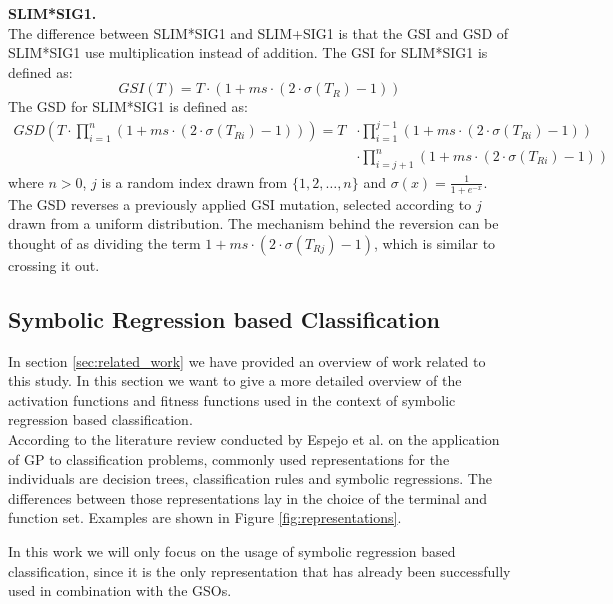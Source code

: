 \documentclass[manuscript, review, anonymous]{acmart} %
\begin{document}
\textbf{SLIM*SIG1.}\\
The difference between SLIM*SIG1 and SLIM+SIG1 is that the GSI
and GSD of SLIM*SIG1 use multiplication instead of addition.
The GSI for SLIM*SIG1 is defined as:
\[
GSI(T) = T \cdot \left(1 + ms \cdot \left(2 \cdot \sigma(T_R) - 1\right)\right)
\]
The GSD for SLIM*SIG1 is defined as:
\begin{align*}
GSD\left(T \cdot \prod_{i=1}^{n} \left(1 + ms \cdot \left(2 \cdot \sigma(T_{Ri}) - 1\right)\right)\right)
= T &\cdot \prod_{i=1}^{j-1} \left(1 + ms \cdot \left(2 \cdot \sigma(T_{Ri}) - 1\right)\right) \\
    &\cdot \prod_{i=j+1}^{n} \left(1 + ms \cdot \left(2 \cdot \sigma(T_{Ri}) - 1\right)\right)
\end{align*}
where \( n > 0 \), \( j \) is a random index drawn from \( \{1, 2, \dots, n\} \) and \( \sigma(x) = \frac{1}{1 + e^{-x}} \).\\
The GSD reverses a previously applied GSI mutation, selected according
to \( j \) drawn from a uniform distribution.
The mechanism behind the reversion can be thought of as dividing the term \(1 + ms \cdot \left(2 \cdot \sigma(T_{Rj}) - 1\right)\), 
which is similar to crossing it out.

\subsection{Symbolic Regression based Classification}
\label{sec:regressionlikeclassification}
In section \ref{sec:related_work} we have provided an overview of work related to this study.
In this section we want to give a more detailed overview of the activation 
functions and fitness functions used in the context of symbolic regression based classification.\\
According to the literature review conducted by Espejo et al. \cite{Espejo2010} on the
application of GP to classification problems,
commonly used representations for the individuals are decision trees, classification
rules and symbolic regressions.
The differences between those representations lay in the choice of
the terminal and function set.
Examples are shown in Figure \ref{fig:representations}.

\noindent In this work we will only focus on the 
usage of symbolic regression based classification, 
since it is the only representation that has already been
successfully used in combination with the GSOs.
\end{document}
